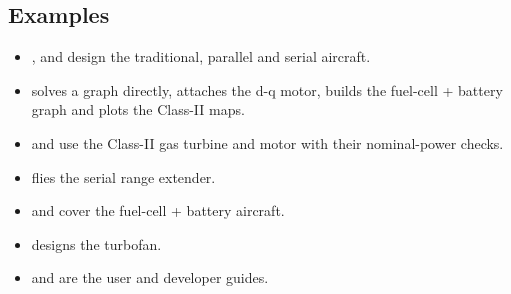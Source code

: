 \documentclass[a4paper,11pt]{article}
\begin{document}
\subsection{Examples}
\begin{itemize}
\item {},  and
   design the traditional, parallel and serial aircraft.
\item {} solves a graph directly,
  attaches the d-q motor, builds the fuel-cell + battery graph and plots the Class-II maps.
\item {} and 
  use the Class-II gas turbine and motor with their nominal-power checks.
\item {} flies the serial range extender.
\item {} and
   cover the fuel-cell + battery aircraft.
\item {} designs the turbofan.
\item {} and 
  are the user and developer guides.
\end{itemize}
\end{document}
